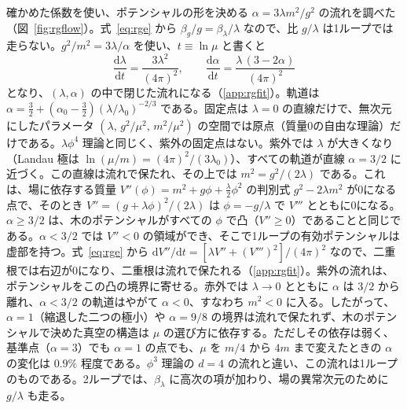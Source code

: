 \documentclass[a4paper,10pt]{ltjsarticle}
\newcommand{\dd}{\mathrm{d}}
\begin{document}
確かめた係数を使い、ポテンシャルの形を決める $\alpha=3\lambda m^2/g^2$ の流れを調べた（図~\ref{fig:rgflow}）。式~\eqref{eq:rge} から $\beta_g/g=\beta_\lambda/\lambda$ なので、比 $g/\lambda$ は1ループでは走らない。$g^2/m^2=3\lambda/\alpha$ を使い、$t\equiv\ln\mu$ と書くと
\begin{equation*}
\frac{\dd\lambda}{\dd t}=\frac{3\lambda^2}{(4\pi)^2},\qquad
\frac{\dd\alpha}{\dd t}=\frac{\lambda\,(3-2\alpha)}{(4\pi)^2}
\end{equation*}
となり、$(\lambda,\alpha)$ の中で閉じた流れになる（\ref{app:rgfit}）。軌道は $\alpha=\frac32+(\alpha_0-\frac32)(\lambda/\lambda_0)^{-2/3}$ である。固定点は $\lambda=0$ の直線だけで、無次元にしたパラメータ $(\lambda,\,g^2/\mu^2,\,m^2/\mu^2)$ の空間では原点（質量0の自由な理論）だけである。$\lambda\phi^4$ 理論と同じく、紫外の固定点はない。紫外では $\lambda$ が大きくなり（Landau 極は $\ln(\mu/m)=(4\pi)^2/(3\lambda_0)$）、すべての軌道が直線 $\alpha=3/2$ に近づく。この直線は流れで保たれ、その上では $m^2=g^2/(2\lambda)$ である。これは、場に依存する質量 $V''(\phi)=m^2+g\phi+\frac\lambda2\phi^2$ の判別式 $g^2-2\lambda m^2$ が0になる点で、そのとき $V''=(g+\lambda\phi)^2/(2\lambda)$ は $\phi=-g/\lambda$ で $V'''$ とともに0になる。$\alpha\ge3/2$ は、木のポテンシャルがすべての $\phi$ で凸（$V''\ge0$）であることと同じである。$\alpha<3/2$ では $V''<0$ の領域ができ、そこで1ループの有効ポテンシャルは虚部を持つ。式~\eqref{eq:rge} から $\dd V''/\dd t=[\lambda V''+(V''')^2]/(4\pi)^2$ なので、二重根では右辺が0になり、二重根は流れで保たれる（\ref{app:rgfit}）。紫外の流れは、ポテンシャルをこの凸の境界に寄せる。赤外では $\lambda\to0$ とともに $\alpha$ は $3/2$ から離れ、$\alpha<3/2$ の軌道はやがて $\alpha<0$、すなわち $m^2<0$ に入る。したがって、$\alpha=1$（縮退した二つの極小）や $\alpha=9/8$ の境界は流れで保たれず、木のポテンシャルで決めた真空の構造は $\mu$ の選び方に依存する。ただしその依存は弱く、基準点（$\alpha=3$）でも $\alpha=1$ の点でも、$\mu$ を $m/4$ から $4m$ まで変えたときの $\alpha$ の変化は $0.9\%$ 程度である。$\phi^3$ 理論の $d=4$ の流れと違い、この流れは1ループのものである。2ループでは、$\beta_\lambda$ に高次の項が加わり、場の異常次元のために $g/\lambda$ も走る。
\end{document}
